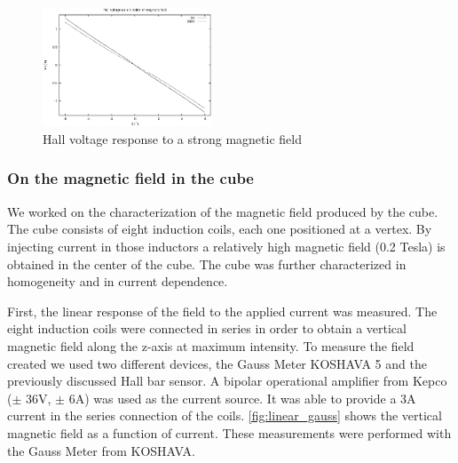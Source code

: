\documentclass[journal,a4paper]{IEEEtran}
\begin{document}
\begin{figure}[h]
\centering
\includegraphics[width=0.45\textwidth]{tension_hall_fonction_champ_6T.eps}
\caption{Hall voltage response to a strong magnetic field}
\label{fig:hall_champ_6}
\end{figure}






\subsubsection{On the magnetic field in the cube}

We worked on the characterization of the magnetic field produced by the cube. The cube consists of eight induction coils, each one positioned at a vertex. By injecting current in those inductors a relatively high magnetic field (0.2 Tesla) is obtained in the center of the cube. The cube was further characterized in homogeneity and in current dependence.



First, the linear response of the field to the applied current was measured. The eight induction coils were connected in series in order to obtain a vertical magnetic field along the z-axis at maximum intensity. To measure the field created we used two different devices, the Gauss Meter KOSHAVA 5 and the previously discussed Hall bar sensor. A bipolar operational amplifier from Kepco ($\pm$ 36V, $\pm$ 6A) was used as the current source. It was able to provide a 3A current in the series connection of the coils. \figurename \ref{fig:linear_gauss} shows the vertical magnetic field as a function of current. These measurements were performed with the Gauss Meter from KOSHAVA.
\end{document}
